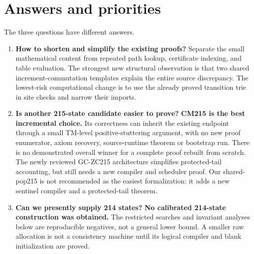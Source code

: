 \documentclass[11pt]{article}
\begin{document}
\section{Answers and priorities}
The three questions have different answers.
\begin{enumerate}
\item \textbf{How to shorten and simplify the existing proofs?} Separate the small mathematical content from repeated path lookup, certificate indexing, and table evaluation. The strongest new structural observation is that two shared increment-commutation templates explain the entire source discrepancy. The lowest-risk computational change is to use the already proved transition trie in site checks and narrow their imports.
\item \textbf{Is another 215-state candidate easier to prove?} \textbf{CM215 is the best incremental choice.} Its correctness can inherit the existing endpoint through a small TM-level positive-stuttering argument, with no new proof enumerator, axiom recovery, source-runtime theorem or bootstrap run. There is no demonstrated overall winner for a complete proof rebuilt from scratch. The newly reviewed GC-ZC215 architecture simplifies protected-tail accounting, but still needs a new compiler and scheduler proof. Our shared-pop215 is not recommended as the easiest formalization: it adds a new sentinel compiler and a protected-tail theorem.
\item \textbf{Can we presently supply 214 states?} \textbf{No calibrated 214-state construction was obtained.} The restricted searches and invariant analyses below are reproducible negatives, not a general lower bound. A smaller raw allocation is not a consistency machine until its logical compiler and blank initialization are proved.
\end{enumerate}
\end{document}
